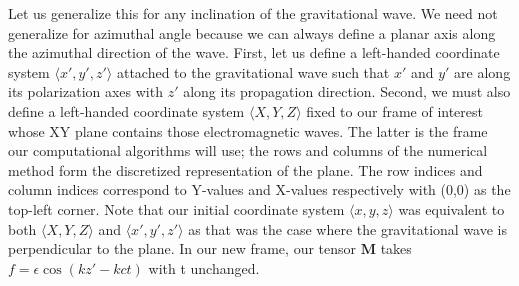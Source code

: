 \documentclass{article}
\begin{document}
Let us generalize this for any inclination of the gravitational wave. We need not generalize for azimuthal angle because we can always define a planar axis along the azimuthal direction of the wave. First, let us define a left-handed coordinate system $\langle x\prime,y\prime,z\prime\rangle$ attached to the gravitational wave such that $x\prime$ and $y\prime$ are along its polarization axes with $z\prime$ along its propagation direction. Second, we must also define a left-handed coordinate system $\langle X,Y,Z \rangle$ fixed to our frame of interest whose XY plane contains those electromagnetic waves. The latter is the frame our computational algorithms will use; the rows and columns of the numerical method form the discretized representation of the plane. The row indices and column indices correspond to Y-values and X-values respectively with (0,0) as the top-left corner. Note that our initial coordinate system $\langle x,y,z\rangle$ was equivalent to both $\langle X,Y,Z\rangle$ and $\langle x\prime,y\prime,z\prime\rangle$ as that was the case where the gravitational wave is perpendicular to the plane. In our new frame, our tensor $\textbf{M}$ takes $f=\epsilon \cos(kz\prime-kct)$ with t unchanged.
\end{document}
